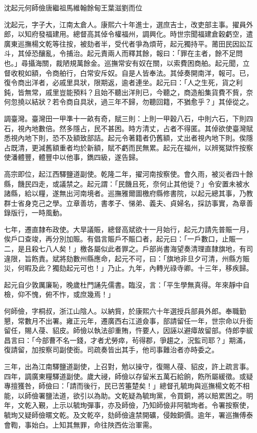 
\begin{pinyinscope}
沈起元何師儉唐繼祖馬維翰餘甸王葉滋劉而位

沈起元，字子大，江南太倉人。康熙六十年進士，選庶吉士，改吏部主事。擢員外郎，以知府發福建用。總督高其倬令權福州，調興化。時世宗聞福建倉穀虧空，遣廣東巡撫楊文乾等往按，被劾者半，受代者爭為煩苛，起元獨持平。莆田民因訟互斗，其倬恐釀亂，令捕治。起元責兩人而釋其餘，報曰：「罪在主者，餘不足問也。」尋攝海關，裁陋規萬餘金。巡撫常安有奴在關，以索費困商舶。起元聞，立督收稅如額，令商舶行，白常安斥奴。自是人皆奉法。其倬奏開南洋，報可。已，復令商出洋者，必戚里具狀，限期返，逾者連坐。起元曰：「人之生死，貨之利鈍，皆無常，戚里豈能預料？且始不聽出洋則已，今聽之，商造船集貨費不貲，奈何忽撓以結狀？若令商自具狀，過三年不歸，勿聽回籍，不猶愈乎？」其倬從之。

調臺灣。臺灣田一甲準十一畝有奇，賦三則：上則一甲穀八石，中則六石，下則四石，視內地數倍。然多隱占，民不甚困。時方清丈，占者不得匿。其倬欲使臺灣賦悉視內地下則，恐不及額致部詰。起元令著籍者仍舊額，丈出者視內地下則。俟隱占既清，更減舊額重者均於新額，賦不虧而民無累。起元在福州，以辨冤獄忤按察使潘體豐，體豐中以他事，鐫四級，遂告歸。

高宗即位，起江西驛鹽道副使。乾隆二年，擢河南按察使。會久雨，被災者四十餘縣，饑民四走，或議禁之。起元謂：「民饑且死，奈何止其他徙？」令安置未被水諸縣，給以糧，遂無出河南境者。巡撫雅爾圖檄府縣修書院，以起元總其事，乃教群士省身克己之學。立章善坊，書孝子、悌弟、義夫、貞婦名，採訪事實，為章善錄版行，一時風動。

七年，遷直隸布政使。大旱議賑，總督高斌欲十一月始行，起元力請先普賑一月，俟戶口查竣，再分別加賑。有倡言賑戶不賑口者，起元曰：「一戶數口，止賑一二，是且殺七八人矣！」檄各屬似此者罪之。戶部尚書海望奏清理直隸旗地，有司違限，旨飭責。斌將劾數州縣應命，起元不可，曰：「旗地非旦夕可清，州縣方賑災，何暇及此？獨劾起元可也！」乃止。九年，內轉光祿寺卿。十三年，移疾歸。

起元自少敦厲廉恥，晚歲杜門誦先儒書。臨沒，言：「平生學無真得。年來靜中自檢，仰不愧，俯不怍，或庶幾焉！」

何師儉，字桐叔，浙江山陰人。以納貲，於康熙六十年選授兵部員外郎。奉職勤懇，常數月不出署。雍正元年，遷廣西右江道僉事，部請留任一年，世宗命以升銜留任，賜人葠、貂皮。師儉以執法卻重賄，忤要人，因誣以避瘴故留部。侍郎李紱昌言曰：「今部曹不名一錢，才者尤勞瘁，茍得郡，爭趨之，況監司耶？」期滿，復請留，加按察司副使銜。司疏奏皆出其手，他司事難治者亦時委之。

三年，出為江南驛鹽道副使，上召對，勉以操守，復賜人葠、貂皮，許上疏言事。四年，調廣東糧驛道副使。歲大祲，師儉以存留米五萬石給餉，飭所屬緩徵。或疑專擅獲咎，師儉曰：「請而後行，民已苦箠楚矣！」總督孔毓珣與巡撫楊文乾不相能，以師儉署鹽法道，欲引以為助。文乾疑為毓珣黨，令買銅，將以賠累困之。明年，文乾入覲，上示以毓珣彈事，亦及師儉，乃知師儉非阿毓珣者。令署按察使，毓珣又疑師儉暱文乾。及文乾卒，劾師儉違禁開礦，侵蝕銅價。逾年，署巡撫傅泰會鞫，事始白。上知其無罪，命往陜西佐治軍需。


\end{pinyinscope}

